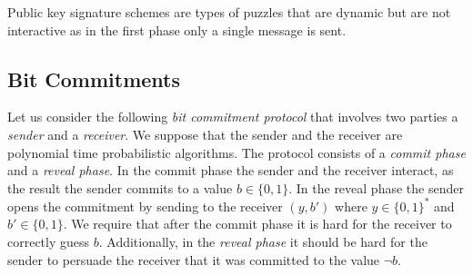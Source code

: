 \documentclass[11pt,a4paper,titlepage]{memoir}
\begin{document}
Public key signature schemes are types of puzzles that are dynamic but are not interactive as in the first phase only a single message is sent.
%
\subsection{Bit Commitments}
Let us consider the following \textit{bit commitment protocol} that involves two parties a \textit{sender} and a \textit{receiver}.
We suppose that the sender and the receiver are polynomial time probabilistic algorithms.
The protocol consists of a \textit{commit phase} and a \textit{reveal phase}.
In the commit phase the sender and the receiver interact, as the result the sender commits to a value $b \in \{0,1\}$.
In the reveal phase the sender opens the commitment by sending to the receiver $(y,b')$ where $y \in \{0,1\}^{*}$ and $b' \in \{0,1\}$.
We require that after the commit phase it is hard for the receiver to correctly guess $b$.
Additionally, in the \textit{reveal phase} it should be hard for the sender to persuade the receiver that it was committed to the value $\lnot b$.
\end{document}
